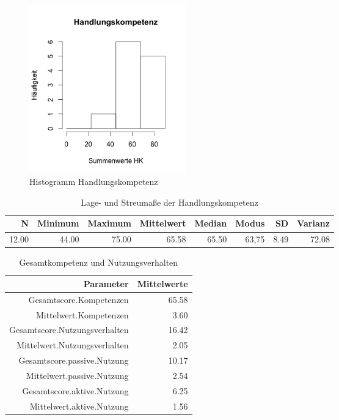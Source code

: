 \documentclass[12pt, bibliography=totoc]{scrartcl}
\begin{document}
\begin{figure}[H]
\centering
\caption{Histogramm Handlungskompetenz}
\includegraphics[width=0.33\textwidth]{Anhang/HKHist.png}
\end{figure}

\begin{table}[H]
\centering
\caption{Lage- und Streumaße der Handlungskompetenz}
\begin{tabular}{rrrrrrrr}
  \hline
  N & Minimum & Maximum & Mittelwert & Median & Modus & SD & Varianz \\
  \hline
12.00 & 44.00 & 75.00 & 65.58 & 65.50 & 63,75 & 8.49 & 72.08 \\
   \hline
\end{tabular}
\end{table}

\begin{table}[H]
\centering
\caption{Gesamtkompetenz und Nutzungsverhalten}
\begin{tabular}{rr}
  \hline
 Parameter & Mittelwerte\\
  \hline
Gesamtscore.Kompetenzen & 65.58 \\
  Mittelwert.Kompetenzen & 3.60 \\
  Gesamtscore.Nutzungsverhalten & 16.42 \\
  Mittelwert.Nutzungsverhalten & 2.05 \\
  Gesamtscore.passive.Nutzung & 10.17 \\
  Mittelwert.passive.Nutzung & 2.54 \\
  Gesamtscore.aktive.Nutzung & 6.25 \\
  Mittelwert.aktive.Nutzung & 1.56 \\
   \hline
\end{tabular}
\end{table}

\pagebreak

\pagebreak
\printbibliography
\pagebreak
\appendix
\end{document}
